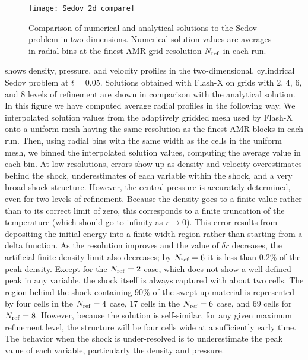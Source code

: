 \begin{figure}
\begin{center}
{\leavevmode\texttt{[image: Sedov\_2d\_compare]}}
\end{center}
\caption{\label{Fig:Sedov compare} Comparison of numerical and analytical
solutions to the Sedov problem in two dimensions. Numerical solution values
are averages in radial bins at the finest AMR grid resolution $N_{\rm ref}$ in each run.
}
\end{figure}
 shows density, pressure, and velocity
profiles in the two-dimensional, cylindrical Sedov problem at
$t=0.05$. Solutions obtained with Flash-X on grids with 2, 4, 6, and 8
levels of refinement are shown in comparison with the analytical
solution. In this figure we have computed average radial profiles in
the following way. We interpolated solution values from the
adaptively gridded mesh used by Flash-X onto a uniform mesh having the
same resolution as the finest AMR blocks in each run. Then, using
radial bins with the same width as the cells in the uniform mesh, we
binned the interpolated solution values, computing the average value
in each bin. At low resolutions, errors show up as density and
velocity overestimates behind the shock, underestimates of each
variable within the shock, and a very broad shock structure.
However, the central pressure is accurately determined, even for two
levels of refinement. Because the density goes to a finite value
rather than to its correct limit of zero, this corresponds to a
finite truncation of the temperature (which should go to infinity as
$r\rightarrow 0$).  This error results from depositing the initial
energy into a finite-width region rather than starting from a delta
function. As the resolution improves and the value of $\delta r$
decreases, the artificial finite density limit also decreases; by
$N_{\rm ref}=6$ it is less than 0.2\% of the peak density. Except
for the $N_{\rm ref}=2$ case, which does not show a well-defined
peak in any variable, the shock itself is always captured with about
two cells. The region behind the shock containing 90\% of the
swept-up material is represented by four cells in the $N_{\rm
ref}=4$ case, 17 cells in the $N_{\rm ref}=6$ case, and 69 cells for
$N_{\rm ref}=8$. However, because the solution is self-similar, for
any given maximum refinement level, the structure will be four cells
wide at a sufficiently early time. The behavior when the shock is
under-resolved is to underestimate the peak value of each variable,
particularly the density and pressure.

